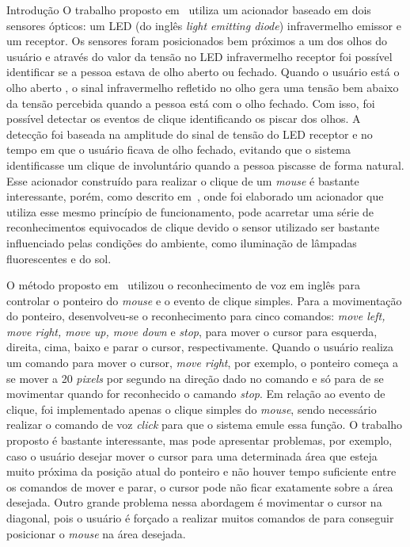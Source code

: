 \begin{chapter}{Introdução}
O trabalho proposto em~\cite{Skim10} utiliza um acionador baseado em dois
sensores ópticos: um LED (do inglês \textit{light emitting diode}) infravermelho
emissor e um receptor. Os sensores foram posicionados bem próximos a um dos
olhos do usuário e através do valor da tensão no LED infravermelho receptor foi
possível identificar se a pessoa estava de olho aberto ou fechado. Quando o
usuário está o olho aberto , o sinal infravermelho refletido no olho gera uma
tensão bem abaixo da tensão percebida quando a pessoa está com o olho fechado.
Com isso, foi possível detectar os eventos de clique identificando os piscar dos
olhos. A detecção foi baseada na amplitude do sinal de tensão do LED receptor e
no tempo em que o usuário ficava de olho fechado, evitando que o sistema
identificasse um clique de involuntário quando a pessoa piscasse de forma
natural. Esse acionador construído para realizar o clique de um \textit{mouse} é
bastante interessante, porém, como descrito em~\cite{Batista17}, onde foi
elaborado um acionador que utiliza esse mesmo princípio de funcionamento, pode
acarretar uma série de reconhecimentos equivocados de clique devido o sensor
utilizado ser bastante influenciado pelas condições do ambiente, como iluminação
de lâmpadas fluorescentes e do sol.

O método proposto em~\cite{Karimullah02} utilizou o reconhecimento de voz em
inglês para controlar o ponteiro do \textit{mouse} e o evento de clique simples.
Para a movimentação do ponteiro, desenvolveu-se o reconhecimento para cinco
comandos: \textit{move left, move right, move up, move down} e \textit{stop},
para mover o cursor para esquerda, direita, cima, baixo e parar o cursor,
respectivamente. Quando o usuário realiza um comando para mover o cursor,
\textit{move right}, por exemplo, o ponteiro começa a se mover a 20
\textit{pixels} por segundo na direção dado no comando e só para de se
movimentar quando for reconhecido o camando \textit{stop}. Em relação ao evento
de clique, foi implementado apenas o clique simples do \textit{mouse}, sendo
necessário realizar o comando de voz \textit{click} para que o sistema emule
essa função. O trabalho proposto é bastante interessante, mas pode apresentar
problemas, por exemplo, caso o usuário desejar mover o cursor para uma
determinada área que esteja muito próxima da posição atual do ponteiro e não
houver tempo suficiente entre os comandos de mover e parar, o cursor pode não
ficar exatamente sobre a área desejada. Outro grande problema nessa abordagem é
movimentar o cursor na diagonal, pois o usuário é forçado a realizar muitos
comandos de para conseguir posicionar o \textit{mouse} na área desejada.   


\end{chapter}
